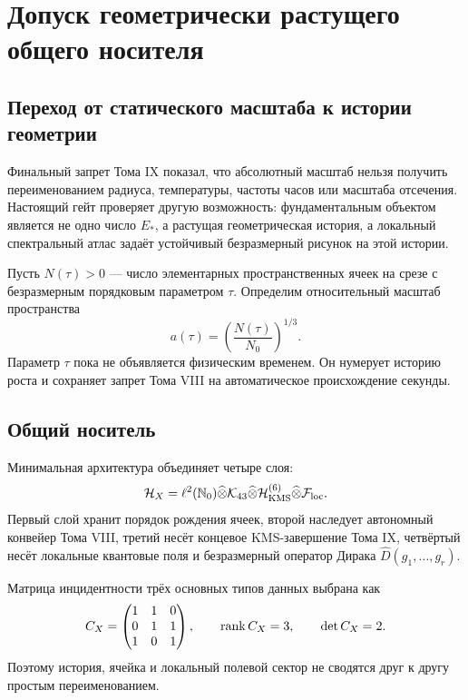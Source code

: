 \chapter{Допуск геометрически растущего общего носителя}
\label{ch:v10-quantum-rg-common-carrier-admission}

\section{Переход от статического масштаба к истории геометрии}

Финальный запрет Тома IX показал, что абсолютный масштаб нельзя получить
переименованием радиуса, температуры, частоты часов или масштаба отсечения.
Настоящий гейт проверяет другую возможность: фундаментальным объектом является
не одно число $E_*$, а растущая геометрическая история, а локальный
спектральный атлас задаёт устойчивый безразмерный рисунок на этой истории.

Пусть $N(\tau)>0$ --- число элементарных пространственных ячеек на срезе с
безразмерным порядковым параметром $\tau$. Определим относительный масштаб
пространства
\begin{equation}
 a(\tau)=\left(\frac{N(\tau)}{N_0}\right)^{1/3}.
 \label{eq:v10-cell-scale-factor}
\end{equation}
Параметр $\tau$ пока не объявляется физическим временем. Он нумерует историю
роста и сохраняет запрет Тома VIII на автоматическое происхождение секунды.

\section{Общий носитель}

Минимальная архитектура объединяет четыре слоя:
\begin{equation}
 \mathcal H_X=
 \ell^2(\mathbb N_0)
 \widehat\otimes \mathcal K_{43}
 \widehat\otimes \mathcal H_{\rm KMS}^{(6)}
 \widehat\otimes \mathcal F_{\rm loc}.
 \label{eq:v10-common-growth-carrier}
\end{equation}
Первый слой хранит порядок рождения ячеек, второй наследует автономный
конвейер Тома VIII, третий несёт концевое KMS-завершение Тома IX, четвёртый
несёт локальные квантовые поля и безразмерный оператор Дирака
$\widehat D(g_1,\ldots,g_r)$.

Матрица инцидентности трёх основных типов данных выбрана как
\begin{equation}
 C_X=
 \begin{pmatrix}
 1&1&0\\
 0&1&1\\
 1&0&1
 \end{pmatrix},
 \qquad \operatorname{rank} C_X=3,
 \qquad \det C_X=2.
 \label{eq:v10-carrier-incidence}
\end{equation}
Поэтому история, ячейка и локальный полевой сектор не сводятся друг к другу
простым переименованием.

